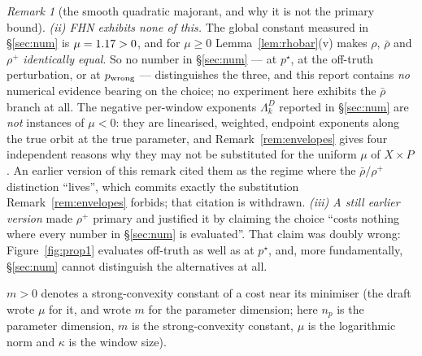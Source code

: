 \documentclass[11pt]{article}
\theoremstyle{remark}\newtheorem{remark}{Remark}
\newcommand{\pstar}{p^\star}
\begin{document}
\begin{remark}[the smooth quadratic majorant, and why it is not the primary bound]
{\emph{(ii) FHN exhibits none of this.} The global constant measured in \S\ref{sec:num} is $\mu=1.17>0$, and for $\mu\ge0$ Lemma~\ref{lem:rhobar}(v) makes $\rho$, $\bar\rho$ and $\rho^{+}$ \emph{identically equal}. So no number in \S\ref{sec:num} --- at $\pstar$, at the off-truth perturbation, or at $p_{\rm wrong}$ --- distinguishes the three, and this report contains \emph{no} numerical evidence bearing on the choice; no experiment here exhibits the $\bar\rho$ branch at all. The negative per-window exponents $\Lambda^D_k$ reported in \S\ref{sec:num} are \emph{not} instances of $\mu<0$: they are linearised, weighted, endpoint exponents along the true orbit at the true parameter, and Remark~\ref{rem:envelopes} gives four independent reasons why they may not be substituted for the uniform $\mu$ of $X\times P$. An earlier version of this remark cited them as the regime where the $\bar\rho/\rho^{+}$ distinction ``lives'', which commits exactly the substitution Remark~\ref{rem:envelopes} forbids; that citation is withdrawn.
\emph{(iii) A still earlier version} made $\rho^{+}$ primary and justified it by claiming the choice ``costs nothing where every number in \S\ref{sec:num} is evaluated''. That claim was doubly wrong: Figure~\ref{fig:prop1} evaluates off-truth as well as at $\pstar$, and, more fundamentally, \S\ref{sec:num} cannot distinguish the alternatives at all.}
\end{remark}
$m>0$ denotes a strong-convexity constant of a cost near its minimiser (the draft wrote $\mu$ for it, and wrote $m$ for the parameter dimension; here $n_p$ is the parameter dimension, $m$ is the strong-convexity constant, $\mu$ is the logarithmic norm and $\kappa$ is the window size).
\end{document}
